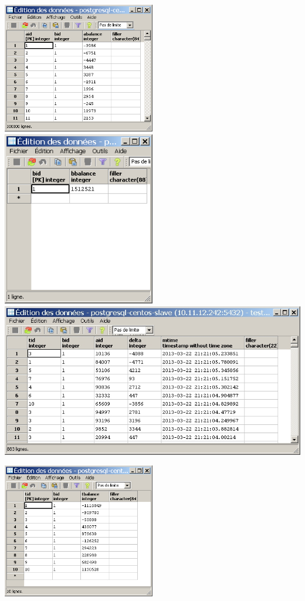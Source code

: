 \documentclass[12pt]{report}
\begin{document}
\includegraphics[width=0.5\textwidth]{./pgadmin3.png}
\includegraphics[width=0.5\textwidth]{./pgadmin4.png}
\includegraphics[width=\linewidth]{./pgadmin5.png}
\begin{center}
  \includegraphics[width=0.5\textwidth]{./pgadmin6.png}
\end{center}
\end{document}
